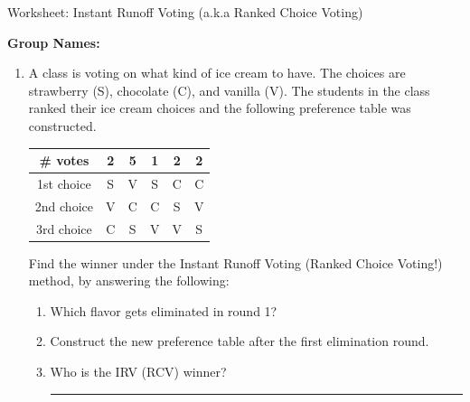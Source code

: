 \documentclass[12pt]{article}
\newcommand{\ans}[1][1in]{\rule{#1}{.5pt}}
\begin{document}
\begin{center}
{\Large  Worksheet:  Instant Runoff Voting (a.k.a Ranked Choice Voting)	 	}
\end{center}



\noindent \textbf{Group Names:} \hrulefill \\
\begin{enumerate}     

\item A class is voting on what kind of ice cream to have. The choices are strawberry (S), chocolate (C), and vanilla (V). The students in the class ranked their ice cream choices and the following preference table was constructed. %




\begingroup %
\renewcommand{\arraystretch}{2} %
    \begin{tabular}{| c  | c | c  | c  | c| c |} \hline
    \# votes & 2 & 5 & 1& 2 & 2\\ \hline \hline
1st choice & S& V& S &C& C\\ \hline
2nd choice &  V &C &  C & S&V\\ \hline
3rd choice & C & S& V & V & S\\ \hline
\end{tabular}
\endgroup 



Find the winner under the Instant Runoff Voting (Ranked Choice Voting!) method, by answering the following:

\begin{enumerate}
\item Which flavor gets eliminated in round 1? \hrulefill
\vspace{1 cm}
\item Construct the new preference table after the first elimination round.
\vfill
\item Who is the IRV (RCV) winner? \ans
\vspace{1in}


\end{enumerate}
\end{enumerate}
\end{document}
